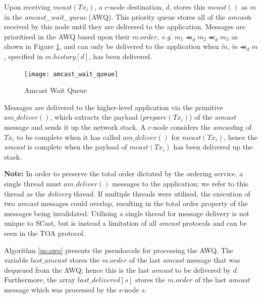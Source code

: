 \begin{enumerate}
        \leftbar
        Upon receiving $mcast(Tx_i)$, a $c$-node destination, $d$, stores this $mcast()$ as $m$ in the \emph{amcast\_wait\_queue} (AWQ).  This priority queue stores all of the \emph{amcast}s received by this node until they are delivered to the application.  Messages are prioritised in the AWQ based upon their $m.order$, \emph{e.g.} $m_1 \llcurly_d m_2 \llcurly_d m_3$ as shown in Figure \ref{fig:awq}, and can only be delivered to the application when $\tilde{m}$, $\tilde{m} \llcurly_d m$, specified in $m.history[d]$, has been delivered.  
        
         \begin{figure}[H] 
        \centering    
         \texttt{[image: amcast\_wait\_queue]}
         \caption[Amcast Wait Queue]{Amcast Wait Queue}
         \label{fig:awq}
    \end{figure}             
        \vspace{-2em}
        Messages are delivered to the higher-level application via the primitive $am\_deliver()$, which extracts the payload ($prepare(Tx_i)$) of the \emph{amcast} message and sends it up the network stack.  A $c$-node considers the \emph{amcast}ing of $Tx_i$ to be complete when it has called $am\_deliver()$ for $mcast(Tx_i)$, hence the \emph{amcast} is complete when the payload of $mcast(Tx_i)$ has been delivered up the stack.  
        
        \textbf{Note: } In order to preserve the total order dictated by the ordering service, a single thread must $am\_deliver()$ messages to the application; we refer to this thread as the \emph{delivery} thread.  If multiple threads were utilised, the execution of two \emph{amcast} messages could overlap, resulting in the total order property of the messages being invalidated.  Utilising a single thread for message delivery is not unique to \textsf{SCast}, but is instead a limitation of all \emph{amcast} protocols and can be seen in the TOA protocol.    
        
        Algorithm \ref{ps:awq} presents the pseudocode for processing the AWQ.  The variable $last\_amcast$ stores the $m.order$ of the last \emph{amcast} message that was dequeued from the AWQ; hence this is the last \emph{amcast} to be delivered by $d$.  Furthermore, the array $last\_delivered[s]$ stores the $m.order$ of the last \emph{amcast} message which was processed by the $s$-node $s$.  
    \endleftbar
    
    \end{enumerate}
